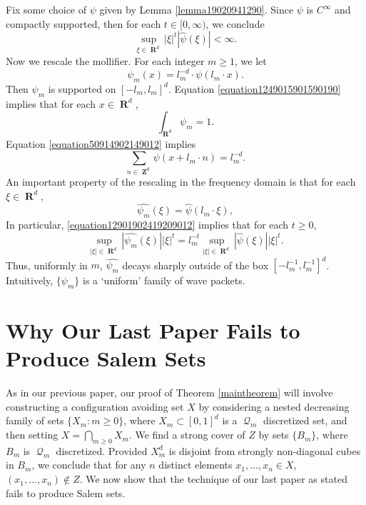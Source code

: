 \documentclass[12pt,reqno]{article}
\numberwithin{equation}{section}
\DeclareMathOperator{\RR}{\mathbf{R}}
\DeclareMathOperator{\ZZ}{\mathbf{Z}}
\DeclareMathOperator{\DQ}{\mathcal{Q}}
\begin{document}
Fix some choice of $\psi$ given by Lemma \ref{lemma19020941290}. Since $\psi$ is $C^\infty$ and compactly supported, then for each $t \in [0,\infty)$, we conclude
%
\begin{equation} \label{equation682928418931289}
	\sup_{\xi \in \RR^d} |\xi|^t |\widehat{\psi}(\xi)| < \infty.
\end{equation}
%
Now we rescale the mollifier. For each integer $m \geq 1$, we let
%
\[ \psi_m(x) = l_m^{-d} \cdot \psi(l_m \cdot x). \]
%
Then $\psi_m$ is supported on $[-l_m,l_m]^d$. Equation \eqref{equation1249015901590190} implies that for each $x \in \RR^d$,
%
\begin{equation} \label{equation19204910490190190}
	\int_{\RR^d} \psi_m = 1.
\end{equation}
%
Equation \eqref{equation50914902149012} implies
%
\begin{equation} \label{equation990249012409129041290} \sum_{n \in \ZZ^d} \psi(x + l_m \cdot n) = l_m^{-d}. \end{equation}
%
An important property of the rescaling in the frequency domain is that for each $\xi \in \RR^d$,
%
\begin{equation} \label{equation12901902419209012}
    \widehat{\psi_m}(\xi) = \widehat{\psi}(l_m \cdot \xi),
\end{equation}
%
In particular, \eqref{equation12901902419209012} implies that for each $t \geq 0$,
%
\begin{equation}
    \sup_{|\xi| \in \RR^d} |\widehat{\psi_m}(\xi)| |\xi|^t = l_m^{-t} \sup_{|\xi| \in \RR^d} |\widehat{\psi}(\xi)| |\xi|^t.
\end{equation}
%
Thus, uniformly in $m$, $\widehat{\psi_m}$ decays sharply outside of the box $[-l_m^{-1}, l_m^{-1}]^d$. Intuitively, $\{ \psi_m \}$ is a `uniform' family of wave packets.

\section{Why Our Last Paper Fails to Produce Salem Sets}

As in our previous paper, our proof of Theorem \ref{maintheorem} will involve constructing a configuration avoiding set $X$ by considering a nested decreasing family of sets $\{ X_m : m \geq 0 \}$, where $X_m \subset [0,1]^d$ is a $\DQ_m$ discretized set, and then setting $X = \bigcap_{m \geq 0} X_m$. We find a strong cover of $Z$ by sets $\{ B_m \}$, where $B_m$ is $\DQ_m$ discretized. Provided $X_m^d$ is disjoint from strongly non-diagonal cubes in $B_m$, we conclude that for any $n$ distinct elements $x_1, \dots, x_n \in X$, $(x_1,\dots,x_n) \not \in Z$. We now show that the technique of our last paper as stated fails to produce Salem sets.
\end{document}
